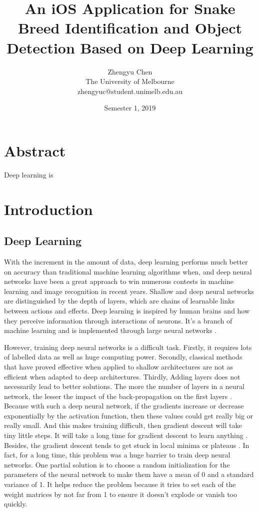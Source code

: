 \documentclass{article}
\begin{document}
\title{An iOS Application for Snake Breed Identification and Object Detection Based on Deep Learning}
\author{Zhengyu Chen \\ The University of Melbourne \\ zhengyuc@student.unimelb.edu.au}
\date{Semester 1, 2019}
\maketitle
\newpage

\tableofcontents
\newpage

\section{Abstract}

Deep learning is


\section{Introduction}

\subsection{Deep Learning}

With the increment in the amount of data, deep learning performs much better on accuracy than traditional machine learning algorithms when, and deep neural networks have been a great approach to win numerous contests in machine learning and image recognition in recent years. Shallow and deep neural networks are distinguished by the depth of layers, which are chains of learnable links between actions and effects. Deep learning is inspired by human brains and how they perceive information through interactions of neurons. It’s a branch of machine learning and is implemented through large neural networks \cite{1}.

However, training deep neural networks is a difficult task. Firstly, it requires lots of labelled data as well as huge computing power. Secondly, classical methods that have proved effective when applied to shallow architectures are not as efficient when adapted to deep architectures. Thirdly, Adding layers does not necessarily lead to better solutions. The more the number of layers in a neural network, the lesser the impact of the back-propagation on the first layers \cite{2}. Because with such a deep neural network, if the gradients increase or decrease exponentially by the activation function, then these values could get really big or really small. And this makes training difficult, then gradient descent will take tiny little steps. It will take a long time for gradient descent to learn anything \cite{4}. Besides, the gradient descent tends to get stuck in local minima or plateaus \cite{3}. In fact, for a long time, this problem was a huge barrier to train deep neural networks. One partial solution is to choose a random initialization for the parameters of the neural network to make them have a mean of 0 and a standard variance of 1. It helps reduce the problem because it tries to set each of the weight matrices by not far from 1 to ensure it doesn't explode or vanish too quickly.
\end{document}
